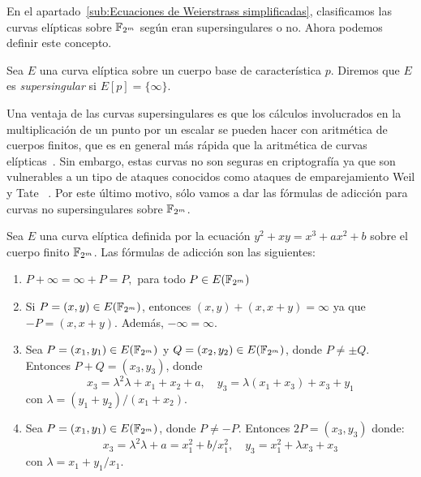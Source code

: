 En el apartado~\ref{sub:Ecuaciones de Weierstrass simplificadas}, clasificamos las curvas elípticas sobre $\mathbb{F}_{2^m}$ según eran supersingulares o no. Ahora podemos definir este concepto.

\begin{definicion}\label{def:supersingular}
	Sea $E$ una curva elíptica sobre un cuerpo base de característica $p$. Diremos que $E$ es \emph{supersingular} si $E[p] = \{\infty\}$.
\end{definicion}

Una ventaja de las curvas supersingulares es que los cálculos involucrados en la multiplicación de un punto por un escalar se pueden hacer con aritmética de cuerpos finitos, que es en general más rápida que la aritmética de curvas elípticas~\cite[cap. 4]{Washington:2008}. Sin embargo, estas curvas no son seguras en criptografía ya que son vulnerables a un tipo de ataques conocidos como ataques de emparejamiento Weil y Tate ~\cite[cap. 4]{Hankerson:2003}. Por este último motivo, sólo vamos a dar las fórmulas de adicción para curvas no supersingulares sobre $\mathbb{F}_{2^m}$.


\begin{formulasadiccion}
Sea $E$ una curva elíptica definida por la ecuación $y^2 + x y = x^3 + a x^2 + b$ sobre el cuerpo finito $\mathbb{F}_{2^m}$. Las fórmulas de adicción son las siguientes:
	\begin{enumerate}[label=\alph*)]
	   \item $P + \infty = \infty + P = P,$ para todo $P \in E(\mathbb{F}_{2^m})$
	   \item Si $P = (x, y) \in E(\mathbb{F}_{2^m})$, entonces $(x, y) + (x, x + y) = \infty$ ya que $-P = (x, x + y)$. Además, $- \infty = \infty$.
	   \item Sea $P = (x_1, y_1) \in E(\mathbb{F}_{2^m})$ y $Q = (x_2, y_2) \in E(\mathbb{F}_{2^m})$, donde $P \neq \pm Q$. Entonces $P + Q = (x_3, y_3)$, donde
	   $$
	   x_3 = \lambda^2 \lambda + x_1 + x_2 + a, \quad
	   y_3 = \lambda (x_1 + x_3) + x_3 + y_1
	   $$
	   con $\lambda = (y_1 + y_2)/(x_1 + x_2)$.
	   \item Sea $P = (x_1, y_1) \in E(\mathbb{F}_{2^m})$, donde $P \neq -P$. Entonces $2 P = (x_3, y_3)$ donde:
	   $$
	   x_3 = \lambda^2 \lambda + a = x_1^2 + b/x_1^2, \quad
	   y_3 = x_1^2 + \lambda x_3 + x_3
	   $$
	   con $\lambda = x_1 + y_1/x_1$.
	\end{enumerate}
\end{formulasadiccion}

